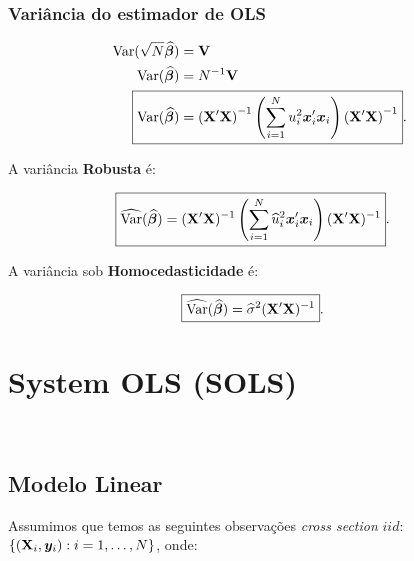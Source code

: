 \documentclass[11pt, oneside, a4paper, article]{article}
\numberwithin{equation}{section}
\begin{document}
\subsubsection{Variância do estimador de OLS }

\vspace{-1 em}
\begin{align*}
\Var(\sqrt{N} \betahatbold) &= \Vmat
\\
\Var(\betahatbold) &= N^{-1} \Vmat
\\
\Aboxed{
\Var(\betahatbold) &= 
\left( \Xmat'\Xmat \right)^{-1}
\left( \sum_{i=1}^{N} u_{i}^2 \xvec_{i}' \xvec_{i} \right)
\left( \Xmat'\Xmat \right)^{-1} }.
\end{align*}

\noindent
A variância \textbf{Robusta} é:

\vspace{-1 em}
\begin{align*}
\Aboxed{
\widehat{\Var}(\betahatbold) &= 
(\Xmat'\Xmat)^{-1} 
\left( \sum_{i=1}^{N} \widehat{u}_{i}^{2} \xvec_{i}' \xvec_{i} \right)
(\Xmat'\Xmat)^{-1} }.
\end{align*}

\noindent
A variância sob \textbf{Homocedasticidade} é:

\vspace{-1 em}
\begin{align*}
	\Aboxed{\widehat{\Var}(\betahatbold) &= \widehat{\sigma}^{2} (\Xmat' \Xmat)^{-1}} .
\end{align*}

\clearpage
\section{System OLS (SOLS)}

\noindent
\citet[C.7 -- Estimating Systems of Equations by OLS and GLS, p.143--179]{wool-2010}\\
\citet[Sec.7.3 -- System OLS Estimation of a Multivariate Linear System, p.147]{wool-2010} 

\subsection{Modelo Linear}

Assumimos que temos as seguintes observações \textit{cross section} $iid$:
$\{ (\mathbf{X}_{i}, \boldsymbol{y}_{i}): i=1, \dots, N\}$, onde:
\end{document}
